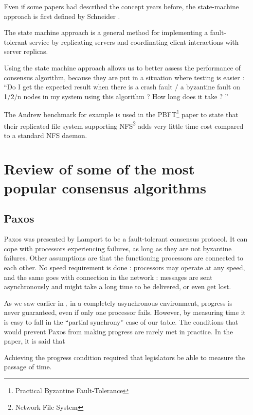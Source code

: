 \documentclass[11pt, twocolumn]{article}
\begin{document}
Even if some papers had described the concept years before, the state-machine approach is first defined by Schneider \cite{stateMachine}.

\begin{displayquote}
    The state machine approach is a general method for implementing a fault-tolerant service by replicating servers and coordinating client interactions with server replicas.
\end{displayquote}

Using the state machine approach allows us to better assess the performance of consensus algorithm, because they are put in a situation where testing is easier : “Do I get the expected result when there is a crash fault / a byzantine fault on 1/2/n nodes in my system using this algorithm ? How long does it take ? ”

The Andrew benchmark \cite{scaleperf} for example is used in the PBFT\footnote{Practical Byzantine Fault-Tolerance} paper \cite{pbft} to state that their replicated file system supporting NFS\footnote{Network File System} adds very little time cost compared to a standard NFS daemon.

\section{Review of some of the most popular consensus algorithms}
\subsection{Paxos}

Paxos was presented by Lamport \cite{parliament} to be a fault-tolerant consensus protocol. It can cope with processors experiencing failures, as long as they are not byzantine failures. Other assumptions are that the functioning processors are connected to each other. No speed requirement is done : processors may operate at any speed, and the same goes with connection in the network : messages are sent asynchronously and might take a long time to be delivered, or even get lost.

As we saw earlier in \cite{fischerlp}, in a completely asynchronous environment, progress is never guaranteed, even if only one processor fails. However, by measuring time it is easy to fall in the “partial synchrony” case of our table. The conditions that would prevent Paxos from making progress are rarely met in practice. In the paper, it is said that

\begin{displayquote}
    Achieving the progress condition required that legislators be able to measure the passage of time.
\end{displayquote}
\end{document}
